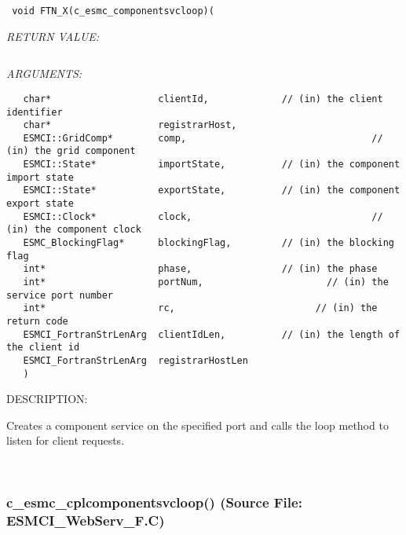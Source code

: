  
\begin{verbatim} void FTN_X(c_esmc_componentsvcloop)(\end{verbatim}{\em RETURN VALUE:}
\begin{verbatim} \end{verbatim}{\em ARGUMENTS:}
\begin{verbatim}   char*                   clientId,             // (in) the client identifier
   char*                   registrarHost,
   ESMCI::GridComp*        comp,                                 // (in) the grid component
   ESMCI::State*           importState,          // (in) the component import state
   ESMCI::State*           exportState,          // (in) the component export state
   ESMCI::Clock*           clock,                                // (in) the component clock
   ESMC_BlockingFlag*      blockingFlag,         // (in) the blocking flag
   int*                    phase,                // (in) the phase
   int*                    portNum,                      // (in) the service port number
   int*                    rc,                         // (in) the return code
   ESMCI_FortranStrLenArg  clientIdLen,          // (in) the length of the client id
   ESMCI_FortranStrLenArg  registrarHostLen
   )\end{verbatim}
{\sf DESCRIPTION:\\ }


      Creates a component service on the specified port and calls the
      loop method to listen for client requests.
   
 
\mbox{}\hrulefill\
 
\subsubsection{c\_esmc\_cplcomponentsvcloop() (Source File: ESMCI\_WebServ\_F.C)}


